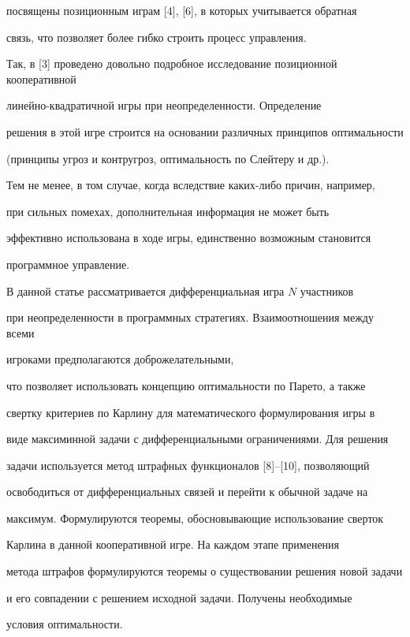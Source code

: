 посвящены позиционным играм [4], [6], в которых учитывается обратная


связь, что позволяет более гибко строить процесс управления.


Так, в [3] проведено довольно подробное исследование позиционной кооперативной


линейно-квадратичной игры при неопределенности. Определение 


решения в этой игре строится на основании различных принципов оптимальности


(принципы угроз и контругроз, оптимальность по Слейтеру и др.). 


Тем не менее, в том случае, когда вследствие каких-либо причин, например,


при сильных помехах, дополнительная информация не может быть


эффективно использована в ходе игры, единственно возможным становится


программное управление.


 


В данной статье рассматривается дифференциальная игра $N$ участников 


при неопределенности в программных стратегиях. Взаимоотношения между всеми 


игроками предполагаются доброжелательными, 


что позволяет использовать концепцию оптимальности по Парето, а также 


свертку критериев по Карлину для математического формулирования игры в 


виде максиминной задачи с дифференциальными ограничениями. Для решения 


задачи используется метод штрафных функционалов [8]--[10], позволяющий 


освободиться от дифференциальных связей и перейти к обычной задаче на 


максимум. Формулируются теоремы, обосновывающие использование сверток 


Карлина в данной кооперативной игре. На каждом этапе применения 


метода штрафов формулируются теоремы о существовании решения новой задачи 


и его совпадении с решением исходной задачи. Получены необходимые 


условия оптимальности. 


 


